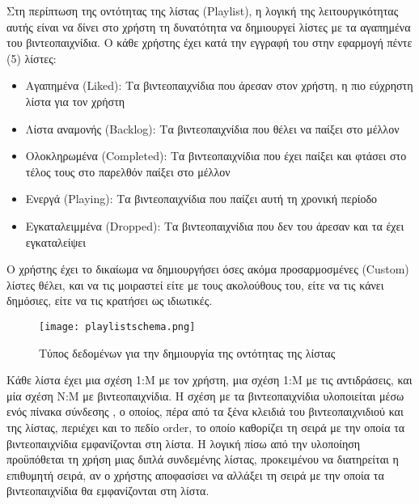   Στη περίπτωση της οντότητας της λίστας (\textlatin{Playlist}), η λογική
  της λειτουργικότητας αυτής είναι να δίνει στο χρήστη τη δυνατότητα να
  δημιουργεί λίστες με τα αγαπημένα του βιντεοπαιχνίδια. Ο κάθε χρήστης
  έχει κατά την εγγραφή του στην εφαρμογή πέντε (5) λίστες:
  \begin{itemize}
    \item
      Αγαπημένα (\textlatin{Liked}): Τα βιντεοπαιχνίδια που άρεσαν στον
      χρήστη, η πιο εύχρηστη λίστα για τον χρήστη
    \item
      Λίστα αναμονής (\textlatin{Backlog}): Τα βιντεοπαιχνίδια που θέλει να
      παίξει στο μέλλον
    \item
      Ολοκληρωμένα (\textlatin{Completed}): Τα βιντεοπαιχνίδια που έχει
      παίξει και φτάσει στο τέλος τους στο παρελθόν παίξει στο μέλλον
    \item
      Ενεργά (\textlatin{Playing}): Τα βιντεοπαιχνίδια που παίζει αυτή τη
      χρονική περίοδο
    \item
      Εγκαταλειμμένα (\textlatin{Dropped}): Τα βιντεοπαιχνίδια που δεν του
      άρεσαν και τα έχει εγκαταλείψει
  \end{itemize}

  Ο χρήστης έχει το δικαίωμα να δημιουργήσει όσες ακόμα προσαρμοσμένες
  \textlatin{(Custom)} λίστες θέλει, και να τις μοιραστεί είτε με τους
  ακολούθους του, είτε να τις κάνει δημόσιες, είτε να τις κρατήσει ως
  ιδιωτικές.

  \begin{figure}[H]
    \begin{center}
      \texttt{[image: playlistschema.png]}
      \caption{Τύπος δεδομένων για την δημιουργία της οντότητας της
      λίστας}
    \end{center}
    \label{fig:playlistSchema}
  \end{figure}

  Κάθε λίστα έχει μια σχέση 1:Μ με τον χρήστη, μια σχέση 1:Μ με τις
  αντιδράσεις, και μία σχέση Ν:Μ με βιντεοπαιχνίδια. Η σχέση με τα
  βιντεοπαιχνίδια υλοποιείται μέσω ενός πίνακα σύνδεσης
  \cite{AtlassianJoin}, ο οποίος, πέρα από τα ξένα κλειδιά του
  βιντεοπαιχνιδιού και της λίστας, περιέχει και το πεδίο
  \textlatin{order}, το οποίο καθορίζει τη σειρά με την οποία τα
  βιντεοπαιχνίδια εμφανίζονται στη λίστα. Η λογική πίσω από την υλοποίηση
  προϋπόθεται τη χρήση μιας διπλά συνδεμένης λίστας, προκειμένου να
  διατηρείται η επιθυμητή σειρά, αν ο χρήστης αποφασίσει να αλλάξει τη
  σειρά με την οποία τα βιντεοπαιχνίδια θα εμφανίζονται στη λίστα.

